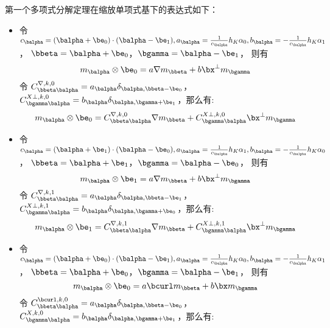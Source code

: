 \begin{property}
    \label{prop:polydecomp}
    第一个多项式分解定理在缩放单项式基下的表达式如下：
    \begin{itemize}
        \item 令 $c_{\balpha} = (\balpha + \be_0)\cdot(\balpha-\be_1), 
            a_{\balpha} = \frac{1}{c_{\balpha}}h_K\alpha_0, 
            b_{\balpha} = -\frac{1}{c_{\balpha}}h_K\alpha_1$，
            $\bbeta = \balpha + \be_0$，$\bgamma = \balpha - \be_1$，
            则有
            $$
            m_{\balpha}\otimes \be_0 = a\nabla m_{\bbeta} +
            b\bx^{\perp}m_{\bgamma}
            $$
            令 $C^{\nabla, k, 0}_{\bbeta\balpha} = a_{\balpha}\delta_{\balpha, \bbeta-\be_0}$，
            $C^{X\perp, k, 0}_{\bgamma\balpha} =
            b_{\balpha}\delta_{\balpha, \bgamma+\be_1}$，那么有:
            $$
            m_{\balpha}\otimes \be_0 =
            C^{\nabla, k, 0}_{\bbeta\balpha}
            \nabla m_{\bbeta} + C^{X\perp, k, 0}_{\bgamma\balpha}
            \bx^{\perp}m_{\bgamma}
            $$
        \item 令 $c_{\balpha} = (\balpha + \be_1)\cdot(\balpha-\be_0),
            a_{\balpha} = \frac{1}{c_{\balpha}}h_K\alpha_1,
            b_{\balpha} = -\frac{1}{c_{\balpha}}h_K\alpha_0$，
            $\bbeta = \balpha + \be_1$，$\bgamma = \balpha - \be_0$，
            则有
            $$
            m_{\balpha}\otimes \be_1 = a\nabla m_{\bbeta} +
            b\bx^{\perp}m_{\bgamma}
            $$
            令 $C^{\nabla, k, 1}_{\bbeta\balpha} = a_{\balpha}\delta_{\balpha,
            \bbeta-\be_1}$，
            $C^{X\perp, k, 1}_{\bgamma\balpha} =
            b_{\balpha}\delta_{\balpha, \bgamma+\be_0}$，那么有:
            $$
            m_{\balpha}\otimes \be_1 =
            C^{\nabla, k, 1}_{\bbeta\balpha}
            \nabla m_{\bbeta} + C^{X\perp, k, 1}_{\bgamma\balpha}
            \bx^{\perp}m_{\bgamma}
            $$
        \item 令 $c_{\balpha} = (\balpha + \be_0)\cdot(\balpha-\be_1),
            a_{\balpha} = \frac{1}{c_{\balpha}}h_K\alpha_0,
            b_{\balpha} = -\frac{1}{c_{\balpha}}h_K\alpha_1$，
            $\bbeta = \balpha + \be_0$，$\bgamma = \balpha - \be_1$，
            则有
            $$
            m_{\balpha}\otimes \be_0 = a \bcurl m_{\bbeta} +
            b\bx m_{\bgamma}
            $$
            令 $C^{\bcurl, k, 0}_{\bbeta\balpha} = a_{\balpha}\delta_{\balpha,
            \bbeta-\be_0}$，
            $C^{X, k, 0}_{\bgamma\balpha} =
            b_{\balpha}\delta_{\balpha, \bgamma+\be_1}$，那么有:

\end{itemize}
\end{property}
